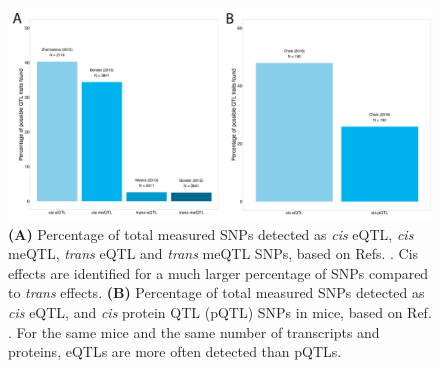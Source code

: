 \begin{figure}[H]
	\includegraphics[width=\textwidth]{chapters/chapter2-genetic-architecture/img/Figure3.png}
	\caption{\textbf{(A)} Percentage of total measured SNPs detected as \textit{cis} eQTL, \textit{cis} meQTL, \textit{trans} eQTL and \textit{trans} meQTL SNPs, based on Refs. \cite{zhernakovaIdentificationContextdependentExpression2017,gibsonExpressionQuantitativeTrait2015,wongInterplayCisTrans2017}. Cis effects are identified for a much larger percentage of SNPs compared to \textit{trans} effects. \textbf{(B)} Percentage of total measured SNPs detected as \textit{cis} eQTL, and \textit{cis} protein QTL (pQTL) SNPs in mice, based on Ref. \cite{GenomeWideMetabolicQTL}. For the same mice and the same number of transcripts and proteins, eQTLs are more often detected than pQTLs.}
	\label{architecture_fig3}
\end{figure}

